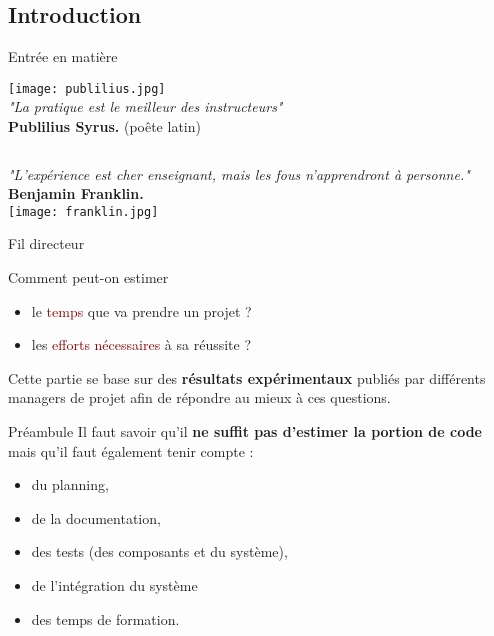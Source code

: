 \documentclass{beamer}
\newcommand{\red}[1]{\textcolor{darkred}{#1}}
\begin{document}
\subsection*{Introduction}

\begin{frame}{Entrée en matière}
\begin{center}
\begin{multicols}{2}
	\texttt{[image: publilius.jpg]} \\
	\textit{"La pratique est le meilleur des instructeurs"} \\
	$ $ \\
	\textbf{Publilius Syrus.} (poête latin) \\
\end{multicols}
\end{center}
$ $ \\
\begin{center}
\begin{multicols}{2}
\textit{"L'expérience est cher enseignant, mais les fous n'apprendront à personne."} \\
$ $ \\
\textbf{Benjamin Franklin.} \\
\texttt{[image: franklin.jpg]}\\
\end{multicols}
\end{center}

\end{frame}

\begin{frame}{Fil directeur}

Comment peut-on estimer 
\begin{itemize}
\pause \item le \red{temps} que va prendre un projet ?
\pause \item les \red{efforts nécessaires} à sa réussite ? \pause \\
\end{itemize}
$ $\\
Cette partie se base sur des \textbf{résultats expérimentaux} publiés par différents managers de projet afin de répondre au mieux 
à ces questions.
\end{frame}

\begin{frame}{Préambule}
Il faut savoir qu'il \textbf{ne suffit pas d'estimer la portion de code} mais qu'il faut également tenir compte : 
\begin{itemize} \pause
\item du planning,
\item de la documentation,
\item des tests (des composants et du système),
\item de l'intégration du système
\item des temps de formation.
\end{itemize}
\end{frame}
\end{document}
